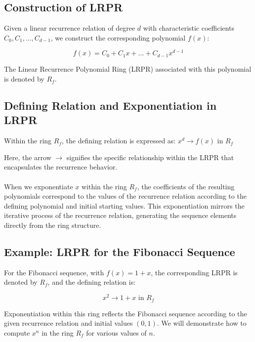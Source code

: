 \documentclass{article}
\theoremstyle{plain}
\begin{document}
\subsection{Construction of LRPR}

Given a linear recurrence relation of degree \( d \) with characteristic coefficients \( C_0, C_1, \ldots, C_{d-1} \), we construct the corresponding polynomial \( f(x) \):

\[ f(x) = C_0 + C_1 x + \ldots + C_{d-1} x^{d-1} \]

The Linear Recurrence Polynomial Ring (LRPR) associated with this polynomial is denoted by \( R_f \).

\subsection{Defining Relation and Exponentiation in LRPR}

Within the ring \( R_f \), the defining relation is expressed as:
\( x^d \rightarrow f(x) \text{ in } R_f \)

Here, the arrow \( \rightarrow \) signifies the specific relationship within the LRPR that encapsulates the recurrence behavior.
\\
\\
When we exponentiate \( x \) within the ring \( R_f \), the coefficients of the resulting polynomials correspond to the values of the recurrence relation according to the defining polynomial and initial starting values. This exponentiation mirrors the iterative process of the recurrence relation, generating the sequence elements directly from the ring structure.

\subsection{Example: LRPR for the Fibonacci Sequence}

For the Fibonacci sequence, with \( f(x) = 1 + x \), the corresponding LRPR is denoted by \( R_f \), and the defining relation is:

\[ x^2 \rightarrow 1 + x \text{ in } R_f \]

Exponentiation within this ring reflects the Fibonacci sequence according to the given recurrence relation and initial values \( (0, 1) \). We will demonstrate how to compute \( x^n \) in the ring \( R_f \) for various values of \( n \).
\end{document}
